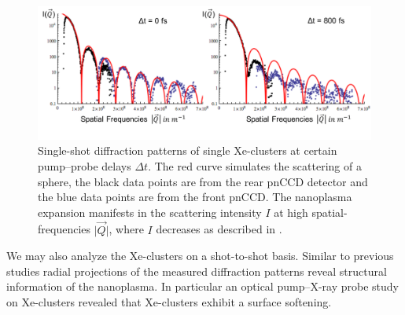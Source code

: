 %
%
%
\begin{figure}
	\centering
		\includegraphics[width=1.0\textwidth]{images/results/Xe-diff-pattern.png}
	\caption[Single-shot diffraction patterns of Xe-clusters at varying time delays]{Single-shot diffraction patterns of single Xe-clusters at certain pump--probe delays $\Delta t$. The red curve simulates the scattering of a sphere, the black data points are from the rear pnCCD detector and the blue data points are from the front pnCCD. The nanoplasma expansion manifests in the scattering intensity $I$ at high spatial-frequencies $\lvert \vec{Q}\rvert$, where $I$ decreases as described in \citep{Gorkhover-2016-NatPho}.}
	\label{fig:Xe-only-diff-pattern}
\end{figure}
We may also analyze the Xe-clusters on a shot-to-shot basis. Similar to previous studies \cite{Gorkhover-2016-NatPho,Rupp-2016-Springer,Bostedt-2012-PRL} radial projections of the measured diffraction patterns reveal structural information of the nanoplasma. In particular an optical pump--X-ray probe study on Xe-clusters \cite{Gorkhover-2016-NatPho} revealed that Xe-clusters exhibit a surface softening.
